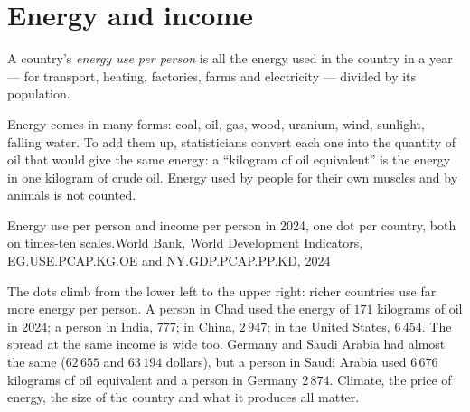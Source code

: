 \section{Energy and income}

\begin{definition}\label{def:g6:food-and-energy:energy-use}
A country's \emph{energy use per person} is all
the energy used in the country in a year --- for transport, heating, factories,
farms and electricity --- divided by its population.
\end{definition}

\begin{measure}
Energy comes in many forms: coal, oil, gas, wood, uranium, wind, sunlight,
falling water. To add them up, statisticians convert each one into the quantity
of oil that would give the same energy: a ``kilogram of oil equivalent'' is the
energy in one kilogram of crude oil. Energy used by people for their own muscles
and by animals is not counted.
\end{measure}

\begin{omchart}{Energy use per person and income per person in 2024, one dot per
country, both on times-ten scales.}{World Bank, World Development Indicators,
EG.USE.PCAP.KG.OE and NY.GDP.PCAP.PP.KD, 2024}
\end{omchart}

The dots climb from the lower left to the upper right: richer countries use far
more energy per person. A person in Chad used the energy of $171$ kilograms of oil
in 2024; a person in India, $777$; in China, $2\,947$; in the United States,
$6\,454$. The spread at the same income is wide too. Germany and Saudi Arabia had
almost the same  ($62\,655$ and $63\,194$ dollars), but a person
in Saudi Arabia used $6\,676$ kilograms of oil equivalent and a person in Germany
$2\,874$. Climate, the price of energy, the size of the country and what it
produces all matter.

